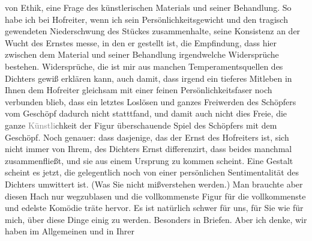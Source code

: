 \begin{ledgroupsized}[t]{13cm}
               von Ethik, eine Frage des künstlerischen Materials und seiner Behandlung. So habe ich
               bei Hofreiter, wenn ich sein
               Persönlichkeitsgewicht und den tragisch gewendeten Niederschwung des Stückes
               zusammenhalte, seine Konsistenz an der Wucht des Ernstes messe, in den er gestellt
               ist, die {\pb}Empfindung, dass hier
               zwischen dem Material und seiner Behandlung irgendwelche Widersprüche bestehen.
               Widersprüche, die ist mir aus manchen Temperamentsquellen des Dichters gewiß erklären
               kann, auch damit, dass irgend ein tieferes Mitleben in Ihnen dem Hofreiter gleichsam mit einer feinen
               Persönlichkeitsfaser noch verbunden blieb, dass ein letztes Loslösen und ganzes
               Freiwerden des Schöpfers vom Geschöpf dadurch nicht statttfand, und damit auch nicht
               dies Freie, die ganze \textcolor{gray}{Künstli}chkeit der Figur überschauende Spiel
               des Schöpfers mit dem Geschöpf. Noch genauer: dass dasjenige, das der Ernst des Hofreiters ist, sich nicht
               immer von Ihrem, des Dichters Ernst differenzirt, dass beides manchmal
               zusammenfließt, und sie aus einem Ursprung zu kommen scheint. Eine Gestalt scheint es
               jetzt, die gelegentlich noch von einer persönlichen Sentimentalität des Dichters
               umwittert ist. (Was Sie nicht mißverstehen werden.) Man brauchte aber diesen Hach nur
               wegzublasen und die vollkommenste Figur für die vollkommenste und edelste Komödie
               träte hervor. \pend
           \pstart
           Es ist natürlich schwer für uns, für Sie wie für mich, über diese Dinge einig zu
               werden. Besonders in Briefen. Aber ich denke, wir haben im Allgemeinen und in Ihrer

\end{ledgroupsized}
